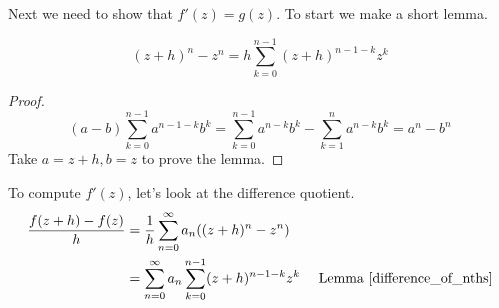 \documentclass{homework}
\begin{document}
\begin{solution}
                                                                                                                                    Next we need to show that $f'(z)=g(z)$. To start we make a short lemma.
                                                                                                                                    \begin{lemma}\label{difference_of_nths}
                                                                                                                                    \[(z+h)^n - z^n = h\sum_{k=0}^{n-1}(z+h)^{n-1-k}z^{k}\]
                                                                                                                                    \end{lemma}
                                                                                                                                    \begin{proof}
                                                                                                                                    \[
                                                                                                                                    (a-b)\sum_{k=0}^{n-1} a^{n-1-k}b^{k}=\sum_{k=0}^{n-1} a^{n-k}b^{k}-\sum_{k=1}^{n}a^{n-k}b^{k} = a^n-b^n
                                                                                                                                    \]
                                                                                                                                    Take $a=z+h, b=z$ to prove the lemma.
                                                                                                                                    \end{proof}
                                                                                                                                    To compute $f'(z)$, let's look at the difference quotient.
                                                                                                                                    \begin{align*}
                                                                                                                                    \frac{f(z+h)-f(z)}{h}
                                                                                                                                    &= \frac{1}{h}\sum_{n=0}^\infty a_n((z+h)^n - z^n) \\
                                                                                                                                    &= \sum_{n=0}^\infty a_n\sum_{k=0}^{n-1}(z+h)^{n-1-k}z^{k}\quad \text{ Lemma \eqref{difference_of_nths}}

\end{align*}
\end{solution}
\end{document}

